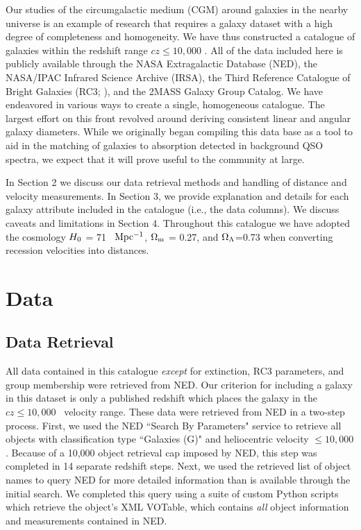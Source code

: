Our studies of the circumgalactic medium (CGM) around galaxies in the nearby universe is an example of research that requires a galaxy dataset with a high degree of completeness and homogeneity. We have thus constructed a catalogue of galaxies within the redshift range $cz \leq 10,000$ \kms. All of the data included here is publicly available through the NASA Extragalactic Database (NED), the NASA/IPAC Infrared Science Archive (IRSA), the Third Reference Catalogue of Bright Galaxies (RC3; \citealt{RC3}), and the \cite{tully2015} 2MASS Galaxy Group Catalog. We have endeavored in various ways to create a single, homogeneous catalogue. The largest effort on this front revolved around deriving consistent linear and angular galaxy diameters. While we originally began compiling this data base as a tool to aid in the matching of galaxies to absorption detected in background QSO spectra,  we expect that it will prove useful to the community at large. 

In Section 2 we discuss our data retrieval methods and handling of distance and velocity measurements. In Section 3, we provide explanation and details for each galaxy attribute included in the catalogue (i.e., the data columns). We discuss caveats and limitations in Section 4. Throughout this catalogue we have adopted the cosmology $H_{\rm 0}$ = 71 \kms ~$\rm Mpc^{-1}$, $\rm \Omega_m$ = 0.27, and $\rm \Omega_{\Lambda}$=0.73 when converting recession velocities into distances.

\section{Data}

\subsection{Data Retrieval}

All data contained in this catalogue \emph{except} for extinction, RC3 parameters, and group membership were retrieved from NED. Our criterion for including a galaxy in this dataset is only a published redshift which places the galaxy in the $cz \leq 10,000$ \kms~velocity range.  These data were retrieved from NED in a two-step process. First, we used the NED ``Search By Parameters" service to retrieve all objects with classification type ``Galaxies (G)" and heliocentric velocity $\leq 10,000$ \kms. Because of a 10,000 object retrieval cap imposed by NED, this step was completed in 14 separate redshift steps. Next, we used the retrieved list of object names to query NED for more detailed information than is available through the initial search. We completed this query using a suite of custom Python scripts which retrieve the object's XML VOTable, which contains \emph{all} object information and measurements contained in NED. 

